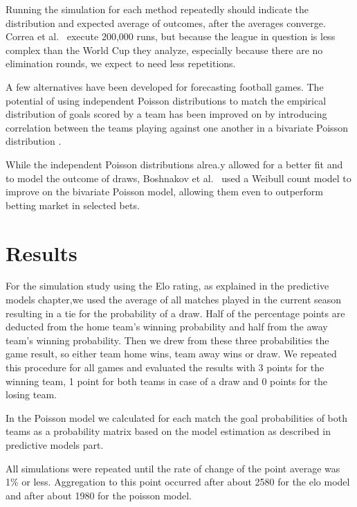 \documentclass[12pt,a4paper]{article}
\begin{document}
Running the simulation for each method repeatedly should indicate the
distribution and expected average of outcomes, after the averages
converge. Correa et al.~\autocite*{correa} execute 200,000 runs, but
because the league in question is less complex than the World Cup they
analyze, especially because there are no elimination rounds, we expect
to need less repetitions.

A few alternatives have been developed for forecasting football games.
The potential of using independent Poisson distributions to match the
empirical distribution of goals scored by a team has been improved on by
introducing correlation between the teams playing against one another in
a bivariate Poisson distribution \textcite{karlis2003}.

While the independent Poisson distributions alrea.y allowed for a better
fit and to model the outcome of draws, Boshnakov et
al.~\autocite*{boshnakov2016} used a Weibull count model to improve on
the bivariate Poisson model, allowing them even to outperform betting
market in selected bets.

\hypertarget{results}{%
\section{Results}\label{results}}

For the simulation study using the Elo rating, as explained in the
predictive models chapter,we used the average of all matches played in
the current season resulting in a tie for the probability of a draw.
Half of the percentage points are deducted from the home team's winning
probability and half from the away team's winning probability. Then we
drew from these three probabilities the game result, so either team home
wins, team away wins or draw. We repeated this procedure for all games
and evaluated the results with 3 points for the winning team, 1 point
for both teams in case of a draw and 0 points for the losing team.

In the Poisson model we calculated for each match the goal probabilities
of both teams as a probability matrix based on the model estimation as
described in predictive models part.

All simulations were repeated until the rate of change of the point
average was 1\% or less. Aggregation to this point occurred after about
2580 for the elo model and after about 1980 for the poisson model.
\end{document}
